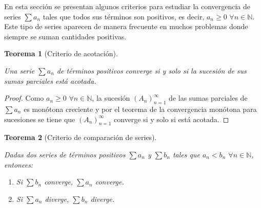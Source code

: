 \documentclass[
  a4paper,
]{scrreport}
\providecommand{\tightlist}{%
  \setlength{\itemsep}{0pt}\setlength{\parskip}{0pt}}\usepackage{longtable,booktabs,array}
\theoremstyle{plain}
\theoremstyle{plain}
\newtheorem{theorem}{Teorema}[chapter]
\theoremstyle{definition}
\theoremstyle{plain}
\theoremstyle{definition}
\theoremstyle{remark}
\begin{document}
En esta sección se presentan algunos criterios para estudiar la
convergencia de series \(\sum a_n\) tales que todos sus términos son
positivos, es decir, \(a_n\geq 0\) \(\forall n\in\mathbb{N}\). Este tipo
de series aparecen de manera frecuente en muchos problemas donde siempre
se suman cantidades positivas.

\leavevmode{}%
\begin{theorem}[Criterio de acotación]\label{thm-criterio-acotacion}

Una serie \(\sum a_n\) de términos positivos converge si y solo si la
sucesión de sus sumas parciales está acotada.

\end{theorem}

\begin{tcolorbox}[enhanced jigsaw, title=\textcolor{quarto-callout-note-color}{\faInfo}\hspace{0.5em}{Demostración}, opacityback=0, titlerule=0mm, colback=white, opacitybacktitle=0.6, colbacktitle=quarto-callout-note-color!10!white, breakable, left=2mm, bottomtitle=1mm, toptitle=1mm, coltitle=black, arc=.35mm, leftrule=.75mm, toprule=.15mm, rightrule=.15mm, bottomrule=.15mm, colframe=quarto-callout-note-color-frame]

\begin{proof}

Como \(a_n\geq 0\) \(\forall n\in\mathbb{N}\), la sucesión
\((A_n)_{n=1}^\infty\) de las sumas parciales de \(\sum a_n\) es
monótona creciente y por el teorema de la convergencia monótona para
sucesiones se tiene que \((A_n)_{n=1}^\infty\) converge si y solo si
está acotada.

\end{proof}

\end{tcolorbox}

\leavevmode{}%
\begin{theorem}[Criterio de comparación de
series]\label{thm-criterio-comparacion}

Dadas dos series de términos positivos \(\sum a_n\) y \(\sum b_n\) tales
que \(a_n<b_n\) \(\forall n\in\mathbb{N}\), entonces:

\begin{enumerate}
\def\labelenumi{\alph{enumi}.}
\tightlist
\item
  Si \(\sum b_n\) converge, \(\sum a_n\) converge.
\item
  Si \(\sum a_n\) diverge, \(\sum b_n\) diverge.
\end{enumerate}

\end{theorem}
\end{document}

